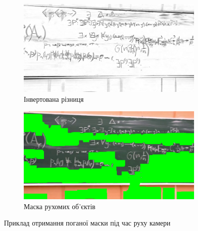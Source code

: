 \begin{figure}[h]
    \centering
    \ContinuedFloat
    \begin{subfigure}[c]{0.4\textwidth}
        \centering
        \includegraphics[width=\textwidth]{images/bad_example_inv_dif}
        \caption{Інвертована різниця
        \label{fig:seminar:bad_example_inv:c}
        }
    \end{subfigure}
    \begin{subfigure}[c]{0.4\textwidth}
        \centering
        \includegraphics[width=\textwidth]{images/bad_example_mask}
        \caption{Маска рухомих об'єктів
        \label{fig:seminar:bad_example_mask:c}
        }
    \end{subfigure}

    \caption{Приклад отримання поганої маски під час руху камери
    \label{fig:seminar:bad_example}
    }
\end{figure}
